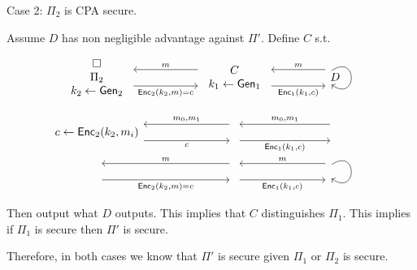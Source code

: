 \documentclass[12pt, letterpaper]{article}
\newcommand{\skcgen}{{\sf Gen}}
\newcommand{\skcenc}{{\sf Enc}}
\begin{document}
\begin{problemproof}
    Case 2: $\Pi_2$ is CPA secure.

    Assume $D$ has non negligible advantage against $\Pi'$. Define $C$ s.t.
    \[\begin{tikzcd}
	\begin{array}{c} \square \\\Pi_2 \\ k_2 \leftarrow \skcgen_2 \end{array} && \begin{array}{c} C\\ k_1 \leftarrow \skcgen_1 \end{array} && D \\
	{c \leftarrow \skcenc_2(k_2, m_i)} && {} && {} \\
	{} && {} && {\phantom{D}}
	\arrow["{\skcenc_2(k_2, m)=c}"', shift right=3, from=1-1, to=1-3]
	\arrow["m"', shift right=3, from=1-3, to=1-1]
	\arrow["{{\skcenc_1(k_1, c)}}"', shift right=3, from=1-3, to=1-5]
	\arrow["m"', shift right=3, from=1-5, to=1-3]
	\arrow[shift right=5, from=1-5, to=1-5, loop, in=325, out=35, distance=10mm]
	\arrow["c"', shift right=3, from=2-1, to=2-3]
	\arrow["{m_0,m_1}"', shift right=3, from=2-3, to=2-1]
	\arrow["{\skcenc_1(k_1,c)}"', shift right=3, from=2-3, to=2-5]
	\arrow["{{m_0,m_1}}"', shift right=3, from=2-5, to=2-3]
	\arrow["{\skcenc_2(k_2, m)=c}"', shift right=3, from=3-1, to=3-3]
	\arrow["m"', shift right=3, from=3-3, to=3-1]
	\arrow["{\skcenc_1(k_1,c)}"', shift right=3, from=3-3, to=3-5]
	\arrow["m"', shift right=3, from=3-5, to=3-3]
	\arrow[shift right=5, from=3-5, to=3-5, loop, in=325, out=35, distance=10mm]
\end{tikzcd}\]
    Then output what $D$ outputs. This implies that $C$ distinguishes $\Pi_1$. This implies if $\Pi_1$ is secure then $\Pi'$ is secure.

    Therefore, in both cases we know that $\Pi'$ is secure given $\Pi_1$ or $\Pi_2$ is secure.
\end{problemproof}
\end{document}
